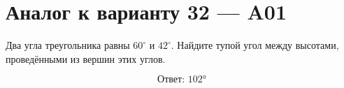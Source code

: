 


\section*{Аналог к варианту 32 — A01}
Два угла треугольника равны \(60^\circ\) и \(42^\circ\). Найдите тупой угол между высотами, проведёнными из вершин этих углов.
\begin{center}\figTriangleAltitudes\end{center}
\[\boxed{\text{Ответ: }102°}\]

